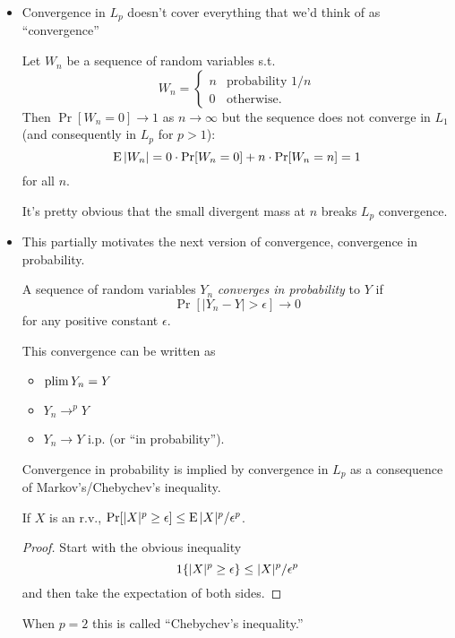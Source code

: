 \begin{itemize}

\item Convergence in $L_p$ doesn't cover everything that we'd think of
  as ``convergence''
  \begin{ex}
    Let $W_n$ be a sequence of random variables s.t.
    \begin{equation*}
      W_n =
      \begin{cases}
        n & \text{probability } 1/n \\
        0 & \text{otherwise}.
      \end{cases}
    \end{equation*}
    Then $\Pr[W_n = 0] \to 1$ as $n \to \infty$ but the sequence does not
    converge in $L_1$ (and consequently in $L_p$ for $p > 1$):
    \begin{equation*}
      \operatorname{E} | W_n | = 0 \cdot \operatorname{Pr}[W_n = 0] + n \cdot \operatorname{Pr}[W_n = n] = 1
    \end{equation*}
    for all $n$.
  \end{ex}
  It's pretty obvious that the small divergent mass at $n$ breaks
  $L_p$ convergence.

\item This partially motivates the next version of convergence,
  convergence in probability.
  \begin{defn}
    A sequence of random variables $Y_n$ \emph{converges in
    probability} to $Y$ if
    \begin{equation*}
      \Pr[ | Y_n - Y | > \epsilon] \to 0
    \end{equation*}
    for any positive constant $\epsilon$.
  \end{defn}
  This convergence can be written as
  \begin{itemize}
  \item $\operatorname*{plim} Y_n = Y$
  \item $Y_n \to^p Y$
  \item $Y_n \to Y$ i.p. (or ``in probability'').
  \end{itemize}

  Convergence in probability is implied by convergence in $L_p$
  as a consequence of Markov's/Chebychev's inequality.
  \begin{thm}
    If $X$ is an r.v., $\operatorname{Pr}[ |X|^p \geq \epsilon ] \leq \operatorname{E} |X|^p /\epsilon^p$.
  \end{thm}
  \begin{proof}
    Start with the obvious inequality
    \begin{equation*}
      \operatorname{1}\{ |X|^p \geq \epsilon \} \leq |X|^p / \epsilon^p
    \end{equation*}
    and then take the expectation of both sides.
  \end{proof}
  When $p = 2$ this is called ``Chebychev's inequality.''


\end{itemize}
